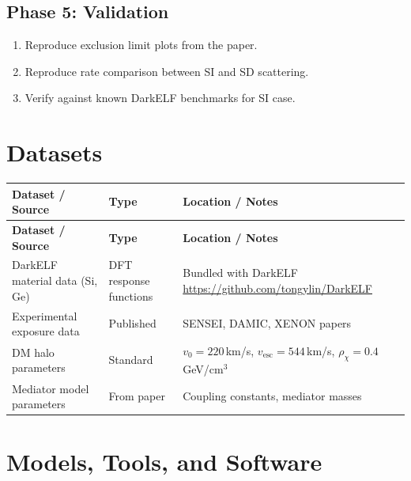 \documentclass[11pt,a4paper]{article}
\begin{document}
\subsection{Phase 5: Validation}
\begin{enumerate}[label=\textbf{5.\arabic*}]
  \item Reproduce exclusion limit plots from the paper.
  \item Reproduce rate comparison between SI and SD scattering.
  \item Verify against known DarkELF benchmarks for SI case.
\end{enumerate}

\section{Datasets}

\begin{longtable}{p{4.5cm} p{3.5cm} p{6cm}}
\toprule
\textbf{Dataset / Source} & \textbf{Type} & \textbf{Location / Notes} \\
\midrule
\endfirsthead
\toprule
\textbf{Dataset / Source} & \textbf{Type} & \textbf{Location / Notes} \\
\midrule
\endhead
DarkELF material data (Si, Ge) & DFT response functions & Bundled with DarkELF \newline \url{https://github.com/tongylin/DarkELF} \\
\midrule
Experimental exposure data & Published & SENSEI, DAMIC, XENON papers \\
\midrule
DM halo parameters & Standard & $v_0 = 220$\,km/s, $v_{\text{esc}} = 544$\,km/s, $\rho_\chi = 0.4$\,GeV/cm$^3$ \\
\midrule
Mediator model parameters & From paper & Coupling constants, mediator masses \\
\bottomrule
\end{longtable}

\section{Models, Tools, and Software}
\end{document}
